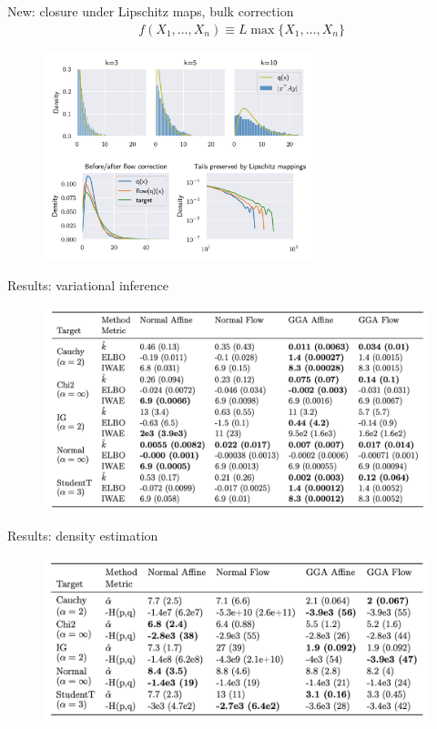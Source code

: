 \begin{frame}{New: closure under Lipschitz maps, bulk correction}
    \begin{align*}
        & f(X_1,\dots,X_n) \equiv L \max\{X_1,\dots,X_n\}
    \end{align*}
    \begin{figure}
        \centering
        \includegraphics[width=0.7\textwidth]{Figures/gga/flow-correction.png}
    \end{figure}
\end{frame}

\begin{frame}{Results: variational inference}
    \begin{figure}
        \centering
        \includegraphics[width=\textwidth]{Figures/gga/vi.png}
    \end{figure}
\end{frame}

\begin{frame}{Results: density estimation}
    \begin{figure}
        \centering
        \includegraphics[width=\textwidth]{Figures/gga/de.png}
    \end{figure}
\end{frame}